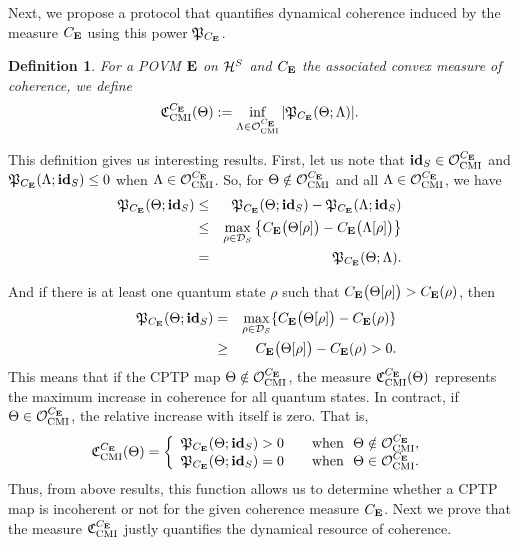 \documentclass[american,aps,pra,reprint, superscriptaddress]{revtex4-1}
\def\be{\begin{equation}}
\def\ee{\end{equation}}
\def\bea{\begin{eqnarray*}}
\def\eea{\end{eqnarray*}}
\theoremstyle{plain}
\newtheorem{defi}[thrm]{Definition}
\newcommand{\id}{\mathbf{id}}
\newcommand{\ids}[1]{\id_{#1}}
\def\mCMI{\textmd{CMI}} \def\mI{\textmd{I}} \def\mPI{\textmd{PI}}
\def\fC{\mathfrak{C}}\def\fD{\mathfrak{D}}\def\fF{\mathfrak{F}}\def\fP{\mathfrak{P}}
\theoremstyle{definition}
\theoremstyle{remark}
\begin{document}
Next, we propose a protocol that quantifies dynamical coherence induced by the measure $C_{\mathbf{E}}$ using this power $\fP_{C_\bE}$.

\begin{defi}\label{df:3}
For a POVM $\mathbf{E}$ on $\mathcal{H}^{S}$ and $C_{\mathbf{E}}$ the associated convex measure of coherence, we define
\be\label{eq:7}
\fC_{\mCMI}^{C_\bE}(\Theta) := \inf_{\Lambda\in \cO_{\mCMI}^{C_\bE}}|\fP_{C_\bE}(\Theta; \Lambda)|.
\ee
\end{defi}

This definition gives us interesting results. First, let us note that $\ids{S}\in \cO_{\mCMI}^{C_\bE}$ and $\fP_{C_\bE}(\Lambda;\ids{S})\leq0$ when $\Lambda\in\cO_{\mCMI}^{C_\bE}$. So, for $\Theta\notin\cO_{\mCMI}^{C_\bE}$ and all $\Lambda \in \cO_{\mCMI}^{C_\bE}$, we have
\bea
\fP_{C_\bE}(\Theta; \ids{S}) &\leq& \fP_{C_\bE}(\Theta; \ids{S})-\fP_{C_\bE}(\Lambda; \ids{S})\\
&\leq&  \max_{\rho\in\cD_S}\big\{C_\bE\big(\Theta[\rho]\big)- C_\bE\big(\Lambda[\rho]\big)\big\}\\
&=&\fP_{C_\bE}(\Theta; \Lambda).
 \eea

And if there is at least one quantum state $\rho$ such that $C_{\mathbf{E}}\big(\Theta[\rho]\big) > C_{\mathbf{E}}(\rho)$, then
  \bea
 \quad \fP_{C_\bE}(\Theta;\ids{S}) &=& \max_{\rho\in\cD_S}\{C_\bE\big(\Theta[\rho]\big)-C_\bE(\rho)\}\\
 &\geq & C_\bE\big(\Theta[\rho]\big) - C_\bE(\rho)>0.
  \eea
This means that if the CPTP map $\Theta\notin \cO_{\mCMI}^{C_\bE}$, the measure $\fC_{\mCMI}^{C_\bE}(\Theta)$ represents the maximum increase in coherence for all quantum states. In contract, if $\Theta\in \cO_{\mCMI}^{C_\bE}$, the relative increase with itself is zero. That is,
\be\label{eq:8}
\fC_{\mCMI}^{C_\bE}(\Theta) = \left\{
  \begin{array}{lr}
   \fP_{C_\bE}(\Theta; \ids{S})>0 \quad &\text{when}~~\Theta\notin \cO_{\mCMI}^{C_\bE},\\
   \fP_{C_\bE}(\Theta; \ids{S})=0 \quad &\text{when}~~\Theta\in \cO_{\mCMI}^{C_\bE}.
  \end{array}
\right.
\ee
Thus, from above results, this function allows us to determine whether a CPTP map is incoherent or not for the given coherence measure $C_{\mathbf{E}}$. Next we prove that the measure $\fC_{\mCMI}^{C_\bE}$ justly quantifies the dynamical resource of coherence.
\end{document}
